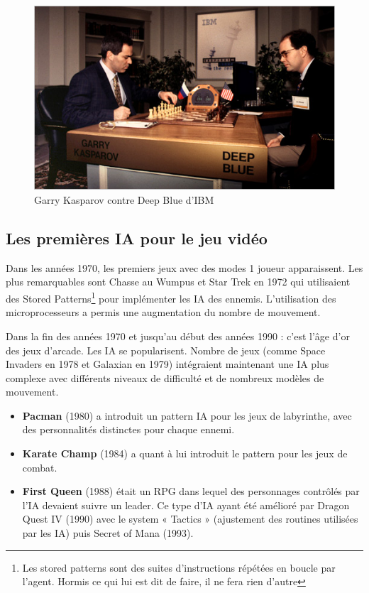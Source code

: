 \documentclass[a4paper, 12pt]{article} %
\begin{document}
\begin{figure}[!h]%
	\begin{center} 
		\includegraphics[width=0.60\columnwidth]{images/DeepBlue.png}%
		\caption{Garry Kasparov contre Deep Blue d'IBM}%
	\end{center}
\end{figure}

\newpage
\subsection{Les premières IA pour le jeu vidéo}
Dans les années 1970, les premiers jeux avec des modes 1 joueur apparaissent. Les plus remarquables sont Chasse au Wumpus et Star Trek en 1972 qui utilisaient des Stored Patterns\footnote{Les stored patterns sont des suites d’instructions répétées en boucle par l’agent. Hormis ce qui lui est dit de faire, il ne fera rien d’autre}  pour implémenter les IA des ennemis. L’utilisation des microprocesseurs a permis une augmentation du nombre de mouvement. 

Dans la fin des années 1970 et jusqu’au début des années 1990 : c’est l’âge d’or des jeux d’arcade. Les IA se popularisent. Nombre de jeux (comme Space Invaders en 1978 et Galaxian en 1979) intégraient maintenant une IA plus complexe avec différents niveaux de difficulté et de nombreux modèles de mouvement. 

\begin{itemize}
	\item \textbf{Pacman} (1980) a introduit un pattern IA pour les jeux de labyrinthe, avec des personnalités distinctes pour chaque ennemi.
	\item \textbf{Karate Champ} (1984) a quant à lui introduit le pattern pour les jeux de combat.
	\item \textbf{First Queen} (1988) était un RPG dans lequel des personnages contrôlés par l’IA devaient suivre un leader. Ce type d’IA ayant été amélioré par Dragon Quest IV (1990) avec le system « Tactics » (ajustement des routines utilisées par les IA) puis Secret of Mana (1993).
\end{itemize}
\end{document}
